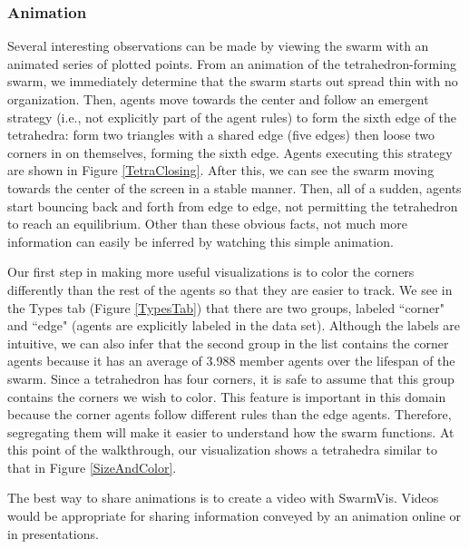 \documentclass[conference]{IEEEtran}
\begin{document}
\subsubsection{Animation}
Several interesting observations can be made by viewing the swarm with an animated series of plotted points.
From an animation of the tetrahedron-forming swarm,
we immediately determine that the swarm starts out spread thin with no organization.
Then, agents move towards the center and follow an emergent strategy (i.e., not explicitly part of the agent rules)
to form the sixth edge of the tetrahedra: form two triangles with a shared edge (five edges) then loose two corners
in on themselves, forming the sixth edge. Agents executing this strategy are shown in Figure \ref{TetraClosing}.
After this, we can see the swarm moving towards the center of the screen in a stable manner.
Then, all of a sudden, agents start bouncing back and forth from edge to edge, not permitting the tetrahedron to
reach an equilibrium.
Other than these obvious facts, not much more information can easily be inferred by watching this simple animation.

Our first step in making more useful visualizations is to color the corners differently than the rest of the agents so that
they are easier to track. We see in the Types tab (Figure \ref{TypesTab}) that there are two groups, labeled
``corner" and ``edge" (agents are explicitly labeled in the data set).
Although the labels are intuitive, we can also infer that the second group in the list
contains the corner agents because it has an average of 3.988 member agents over the lifespan of the swarm.
Since a tetrahedron has four corners, it is safe to assume that this group contains the corners we wish to color.
This feature is important in this domain because the corner agents follow different
rules than the edge agents.
Therefore, segregating them will make it easier to understand how the swarm functions.
At this point of the walkthrough, our visualization shows a tetrahedra similar to that in Figure \ref{SizeAndColor}.

The best way to share animations is to create a video with SwarmVis.
Videos would be appropriate for sharing information conveyed by an animation online or in presentations.
\end{document}
